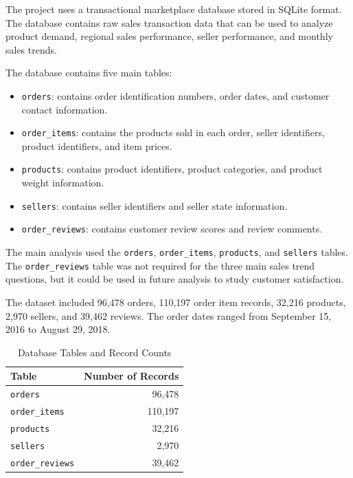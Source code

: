 \documentclass[12pt]{article}
\begin{document}
The project uses a transactional marketplace database stored in SQLite format.
The database contains raw sales transaction data that can be used to analyze
product demand, regional sales performance, seller performance, and monthly sales
trends.

The database contains five main tables:

\begin{itemize}
    \item \texttt{orders}: contains order identification numbers, order dates,
    and customer contact information.
    
    \item \texttt{order\_items}: contains the products sold in each order,
    seller identifiers, product identifiers, and item prices.
    
    \item \texttt{products}: contains product identifiers, product categories,
    and product weight information.
    
    \item \texttt{sellers}: contains seller identifiers and seller state
    information.
    
    \item \texttt{order\_reviews}: contains customer review scores and review
    comments.
\end{itemize}

The main analysis used the \texttt{orders}, \texttt{order\_items},
\texttt{products}, and \texttt{sellers} tables. The \texttt{order\_reviews}
table was not required for the three main sales trend questions, but it could be
used in future analysis to study customer satisfaction.

The dataset included 96,478 orders, 110,197 order item records, 32,216 products,
2,970 sellers, and 39,462 reviews. The order dates ranged from September 15,
2016 to August 29, 2018.

\begin{table}[H]
\centering
\begin{tabular}{lr}
\toprule
Table & Number of Records \\
\midrule
\texttt{orders} & 96,478 \\
\texttt{order\_items} & 110,197 \\
\texttt{products} & 32,216 \\
\texttt{sellers} & 2,970 \\
\texttt{order\_reviews} & 39,462 \\
\bottomrule
\end{tabular}
\caption{Database Tables and Record Counts}
\end{table}
\end{document}

